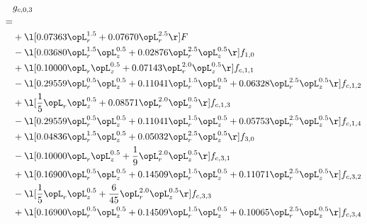 \begin{alignat}{2} 
\label{eq:g_03_0} 
& g_{c,0,3} \nonumber \\ 
 = \\ 
& + \l[  0.07363 \opL_r^{1.5} +  0.07670 \opL_r^{2.5}  \r] F \nonumber \\ 
& - \l[  0.03680 \opL_r^{1.5} \opL_z^{0.5} +  0.02876 \opL_r^{2.5} \opL_z^{0.5}  \r] f_{1,0} \nonumber \\ 
& + \l[  0.10000 \opL_r \opL_z^{0.5} +  0.07143 \opL_r^{2.0} \opL_z^{0.5}  \r] f_{c,1,1} \nonumber \\ 
& - \l[  0.29559 \opL_r^{0.5} \opL_z^{0.5} +  0.11041 \opL_r^{1.5} \opL_z^{0.5} +  0.06328 \opL_r^{2.5} \opL_z^{0.5}  \r] f_{c,1,2} \nonumber \\ 
& + \l[ \frac{1}{5} \opL_r \opL_z^{0.5} +  0.08571 \opL_r^{2.0} \opL_z^{0.5}  \r] f_{c,1,3} \nonumber \\ 
& - \l[  0.29559 \opL_r^{0.5} \opL_z^{0.5} +  0.11041 \opL_r^{1.5} \opL_z^{0.5} +  0.05753 \opL_r^{2.5} \opL_z^{0.5}  \r] f_{c,1,4} \nonumber \\ 
& + \l[  0.04836 \opL_r^{1.5} \opL_z^{0.5} +  0.05032 \opL_r^{2.5} \opL_z^{0.5}  \r] f_{3,0} \nonumber \\ 
& - \l[  0.10000 \opL_r \opL_z^{0.5} + \frac{1}{9} \opL_r^{2.0} \opL_z^{0.5}  \r] f_{c,3,1} \nonumber \\ 
& + \l[  0.16900 \opL_r^{0.5} \opL_z^{0.5} +  0.14509 \opL_r^{1.5} \opL_z^{0.5} +  0.11071 \opL_r^{2.5} \opL_z^{0.5}  \r] f_{c,3,2} \nonumber \\ 
& - \l[ \frac{1}{5} \opL_r \opL_z^{0.5} + \frac{6}{45} \opL_r^{2.0} \opL_z^{0.5}  \r] f_{c,3,3} \nonumber \\ 
& + \l[  0.16900 \opL_r^{0.5} \opL_z^{0.5} +  0.14509 \opL_r^{1.5} \opL_z^{0.5} +  0.10065 \opL_r^{2.5} \opL_z^{0.5}  \r] f_{c,3,4} \nonumber \\ 
\end{alignat} 


